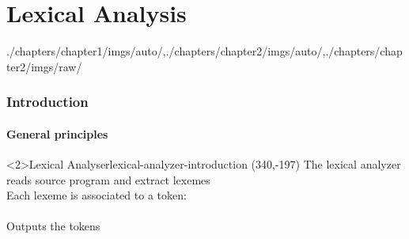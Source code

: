 \part[author={\protect\insertauthor},label={chap:lexical_analysis}]{Lexical Analysis}

\begin{graphicspathcontext}{{./chapters/chapter1/imgs/auto/},{./chapters/chapter2/imgs/auto/},{./chapters/chapter2/imgs/raw/}}
\begin{bibunit}[apalike]
	
\tableofcontentslide

\section{Introduction}
\sectiontableofcontentslide

\subsection{General principles}

\begin{rightlawnframe}<2>{Lexical Analyser}{lexical-analyzer-introduction}
	\putat*(340,-197){}
	The lexical analyzer reads source program and extract lexemes \\[1cm]
	Each lexeme is associated to a token: \\
	 \\[1cm]
	Outputs the tokens
\end{rightlawnframe}


\end{bibunit}
\end{graphicspathcontext}
